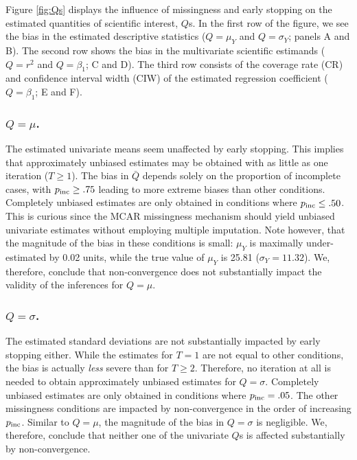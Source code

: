 \documentclass[Royal,times,sageh]{sagej}
\begin{document}
Figure \ref{fig:Qs} displays the influence of missingness and early stopping on the estimated quantities of scientific interest, \(Q\)s. In the first row of the figure, we see the bias in the estimated descriptive statistics (\(Q=\mu_Y\) and \(Q=\sigma_Y\); panels A and B). The second row shows the bias in the multivariate scientific estimands (\(Q=r^2\) and \(Q=\beta_1\); C and D). The third row consists of the coverage rate (CR) and confidence interval width (CIW) of the estimated regression coefficient (\(Q=\beta_1\); E and F).

\hypertarget{qmu.}{%
\subsubsection{\texorpdfstring{\(Q=\mu\).}{Q=\textbackslash mu.}}\label{qmu.}}

The estimated univariate means seem unaffected by early stopping. This implies that approximately unbiased estimates may be obtained with as little as one iteration (\(T \geq 1\)). The bias in \(\bar{Q}\) depends solely on the proportion of incomplete cases, with \(p_{\rm inc}\geq.75\) leading to more extreme biases than other conditions. Completely unbiased estimates are only obtained in conditions where \(p_{\rm inc}\leq.50\). This is curious since the MCAR missingness mechanism should yield unbiased univariate estimates without employing multiple imputation. Note however, that the magnitude of the bias in these conditions is small: \(\mu_Y\) is maximally under-estimated by 0.02 units, while the true value of \(\mu_Y\) is 25.81 (\(\sigma_Y = 11.32\)). We, therefore, conclude that non-convergence does not substantially impact the validity of the inferences for \(Q=\mu\).

\hypertarget{qsigma.}{%
\subsubsection{\texorpdfstring{\(Q=\sigma\).}{Q=\textbackslash sigma.}}\label{qsigma.}}

The estimated standard deviations are not substantially impacted by early stopping either. While the estimates for \(T=1\) are not equal to other conditions, the bias is actually \emph{less} severe than for \(T\geq2\). Therefore, no iteration at all is needed to obtain approximately unbiased estimates for \(Q=\sigma\). Completely unbiased estimates are only obtained in conditions where \(p_{\rm inc}=.05\). The other missingness conditions are impacted by non-convergence in the order of increasing \(p_{\rm inc}\). Similar to \(Q=\mu\), the magnitude of the bias in \(Q=\sigma\) is negligible. We, therefore, conclude that neither one of the univariate \(Q\)s is affected substantially by non-convergence.
\end{document}
